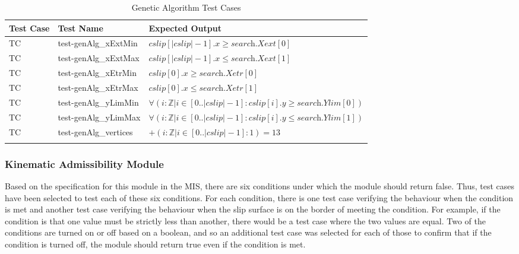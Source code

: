 \documentclass[12pt, titlepage]{article}
\newcounter{utestnum} %
\begin{document}
\begin{longtable}{  l  p{4cm}  p{6cm}  }
	\hline
	\textbf{Test Case} & \textbf{Test Name} & \textbf{Expected Output} \\
	\hline
	TC{utestnum}\theutestnum  \label{TC_GenAlgXextMin} & 
	test-genAlg\_xExtMin &  $\textit{cslip}[|\textit{cslip}|-1].x \geq 
	\textit{search.Xext}[0]$\\
	\hline 
	TC{utestnum}\theutestnum  \label{TC_GenAlgXextMax} & 
	test-genAlg\_xExtMax &  $\textit{cslip}[|\textit{cslip}|-1].x \leq 
	\textit{search.Xext}[1]$\\
	\hline 
	TC{utestnum}\theutestnum  \label{TC_GenAlgXetrMin} & 
	test-genAlg\_xEtrMin &  $\textit{cslip}[0].x \geq \textit{search.Xetr}[0]$\\
	\hline 
	TC{utestnum}\theutestnum  \label{TC_GenAlgXetrMax} & 
	test-genAlg\_xEtrMax &  $\textit{cslip}[0].x \leq \textit{search.Xetr}[1]$\\
	\hline 
	TC{utestnum}\theutestnum  \label{TC_GenAlgYlimMin} & 
	test-genAlg\_yLimMin &  $\forall(i : \mathbb{Z} | i \in 
	[0..|\textit{cslip}|-1] : \textit{cslip}[i].y \geq 
	\textit{search.Ylim}[0])$ \\
	\hline 
	TC{utestnum}\theutestnum  \label{TC_GenAlgYlimMax} & 
	test-genAlg\_yLimMax &  $\forall(i : \mathbb{Z} | i \in 
	[0..|\textit{cslip}|-1] : \textit{cslip}[i].y \leq 
	\textit{search.Ylim}[1])$ \\
	\hline
	TC{utestnum}\theutestnum  \label{TC_GenAlgVertices} & 
	test-genAlg\_vertices &  $+(i : \mathbb{Z} | i \in [0..|\textit{cslip}|-1] 
	: 1) = 13$ \\
	\hline
	\caption{Genetic Algorithm Test Cases}
	\label{GenAlgTests}
\end{longtable}


\subsubsection{Kinematic Admissibility Module}

Based on the specification for this module in the MIS, there are six conditions 
under which the module should return false. Thus, test cases have been selected 
to test each of these six conditions. For each condition, there is one test 
case verifying the behaviour when the condition is met and another test case 
verifying the behaviour when the slip surface is on the border of meeting the 
condition. For example, if the condition is that one value must be strictly 
less than another, there would be a test case where the two values are equal. 
Two of the conditions are turned on or off based on a boolean, and so an 
additional test case was selected for each of those to confirm that if the 
condition is turned off, the module should return true even if the condition is 
met. 
\end{document}

